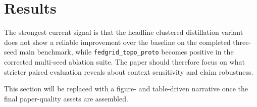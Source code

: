 \section{Results}

The strongest current signal is that the headline clustered distillation variant does not show a reliable improvement over the baseline on the completed three-seed main benchmark, while \texttt{fedgrid\_topo\_proto} becomes positive in the corrected multi-seed ablation suite. The paper should therefore focus on what stricter paired evaluation reveals about context sensitivity and claim robustness.

This section will be replaced with a figure- and table-driven narrative once the final paper-quality assets are assembled.
